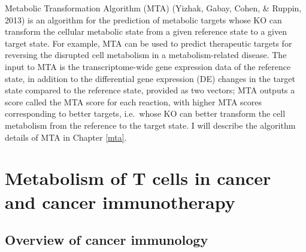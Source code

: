 \documentclass[12pt,twoside,openany,\mydriver]{thesis}  %
\begin{document}
Metabolic Transformation Algorithm (MTA) (Yizhak, Gabay, Cohen, \& Ruppin, 2013) is an algorithm for the prediction of metabolic targets whose KO can transform the cellular metabolic state from a given reference state to a given target state. For example, MTA can be used to predict therapeutic targets for reversing the disrupted cell metabolism in a metabolism-related disease. The input to MTA is the transcriptome-wide gene expression data of the reference state, in addition to the differential gene expression (DE) changes in the target state compared to the reference state, provided as two vectors; MTA outputs a score called the MTA score for each reaction, with higher MTA scores corresponding to better targets, i.e.~whose KO can better transform the cell metabolism from the reference to the target state. I will describe the algorithm details of MTA in Chapter \ref{mta}.

\hypertarget{metabolism-of-t-cells-in-cancer-and-cancer-immunotherapy}{%
\section{Metabolism of T cells in cancer and cancer immunotherapy}\label{metabolism-of-t-cells-in-cancer-and-cancer-immunotherapy}}

\hypertarget{overview-of-cancer-immunology}{%
\subsection{Overview of cancer immunology}\label{overview-of-cancer-immunology}}
\end{document}
